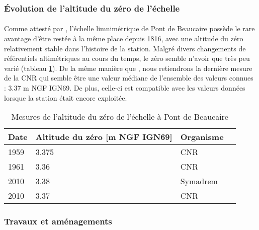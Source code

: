 \documentclass[11pt]{article}
\begin{document}
\FloatBarrier

	\subsubsection{Évolution de l'altitude du zéro de l'échelle}
    
    \paragraph{} Comme attesté par \citet{pichard_hauteurs_2013}, l'échelle limnimétrique de Pont de Beaucaire possède le rare avantage d'être restée à la même place depuis 1816, avec une altitude du zéro relativement stable dans l'histoire de la station. Malgré divers changements de référentiels altimétriques au cours du temps, le zéro semble n'avoir que très peu varié (tableau \ref{tab:zeroPt}). De la même manière que \citet{bard_actualisation_2018}, nous retiendrons la dernière mesure de la CNR qui semble être une valeur médiane de l'ensemble des valeurs connues : 3.37 m NGF IGN69. De plus, celle-ci est compatible avec les valeurs données lorsque la station était encore exploitée.

            \begin{table}[h]
                \centering
                \caption{Mesures de l'altitude du zéro de l'échelle à Pont de Beaucaire}
            	\label{tab:zeroPt}
                \begin{tabular}{| m{1.5cm} | m{3cm}| m{3cm} | m{2cm} |} 
                    \hline
                    Date & Altitude du zéro [m NGF IGN69] & Organisme \\
                    \hline
                    1959 &	3.375 &	CNR\\
                    \hline
                    1961 &	3.36 &	CNR\\
                    \hline
                    2010 &	3.38 &	Symadrem\\
                    \hline
                    2010 &	3.37 &	CNR\\
                    \hline
            \end{tabular}
        \end{table}


\FloatBarrier

		\subsubsection{Travaux et aménagements}
    	\label{subsubsec:TravauxPt}
    
\end{document}
